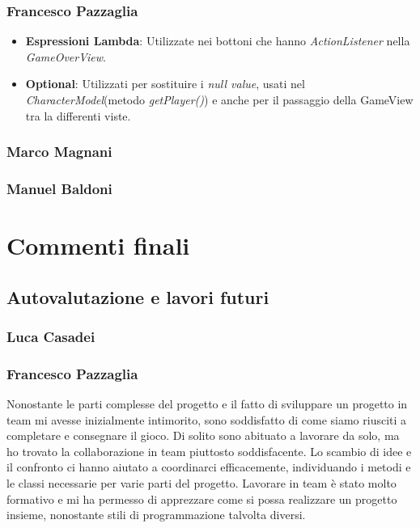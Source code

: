 \documentclass[a4paper,12pt]{report}
\begin{document}
\subsection*{Francesco Pazzaglia}

\begin{itemize}
	\item \textbf{Espressioni Lambda}: Utilizzate nei bottoni che hanno \textit{ActionListener} nella \textit{GameOverView}.
	\item \textbf{Optional}: Utilizzati per sostituire i \textit{null value}, usati nel \textit{CharacterModel}(metodo \textit{getPlayer()}) e anche per il passaggio della GameView tra la differenti viste.
\end{itemize}

\subsection*{Marco Magnani}
\subsection*{Manuel Baldoni}

\chapter{Commenti finali}

\section{Autovalutazione e lavori futuri}

\subsection*{Luca Casadei}
\subsection*{Francesco Pazzaglia}

Nonostante le parti complesse del progetto e il fatto di sviluppare un progetto in team mi avesse inizialmente intimorito, sono soddisfatto di come siamo riusciti a completare e consegnare il gioco. Di solito sono abituato a lavorare da solo, ma ho trovato la collaborazione in team piuttosto soddisfacente. Lo scambio di idee e il confronto ci hanno aiutato a coordinarci efficacemente, individuando i metodi e le classi necessarie per varie parti del progetto. Lavorare in team è stato molto formativo e mi ha permesso di apprezzare come si possa realizzare un progetto insieme, nonostante stili di programmazione talvolta diversi.
\end{document}
